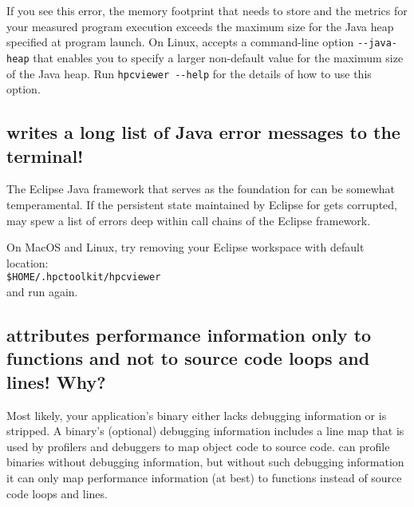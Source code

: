 \documentclass[11pt,twoside,letterpaper]{report}
\begin{document}
If you see this error, the memory footprint that \hpcviewer{} needs to store and the metrics for your measured program execution exceeds the maximum size for the Java heap specified at program launch.  On Linux, \hpcviewer{} accepts a command-line option \verb|--java-heap| that enables you to specify a larger non-default value for the maximum size of the Java heap. Run \verb|hpcviewer --help| for the details of how to use this option.



\subsection{\hpcviewer{} writes a long list of Java error messages to the terminal!}

The Eclipse Java framework that serves as the foundation for \hpcviewer{} can be somewhat temperamental. If the persistent state maintained by Eclipse for \hpcviewer{}
gets corrupted, \hpcviewer{} may spew a list of errors deep within call chains of the Eclipse framework.  

On MacOS and Linux, try removing your \hpcviewer{} Eclipse workspace with default location:\\
 \texttt{\$HOME/.hpctoolkit/hpcviewer} \\
 and run \hpcviewer{} again.



\subsection{\hpcviewer{} attributes performance information only to functions and not to source code loops and lines! Why?}
\label{sec:troubleshooting:debug-info}

Most likely, your application's binary either lacks debugging information or is stripped.
A binary's (optional) debugging information includes a line map that is used by profilers and debuggers to map object code to source code.
\HPCToolkit{} can profile binaries without debugging information, but without such debugging information it can only map performance information (at best) to functions instead of source code loops and lines.
\end{document}
